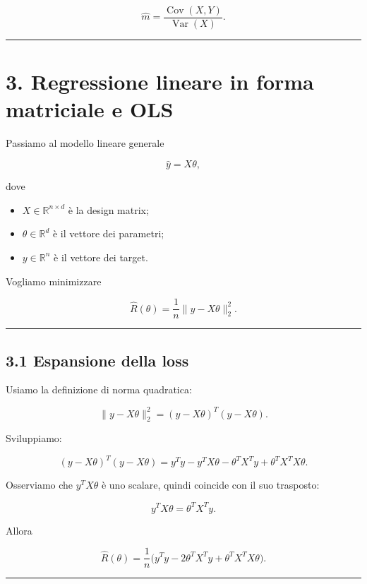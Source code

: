 \documentclass{article}
\providecommand{\tightlist}{%
  \setlength{\itemsep}{0pt}\setlength{\parskip}{0pt}}
\begin{document}
\[
\hat m = \frac{\operatorname{Cov}(X,Y)}{\operatorname{Var}(X)}.
\]

\begin{center}\rule{0.5\linewidth}{0.5pt}\end{center}

\section{3. Regressione lineare in forma matriciale e
OLS}\label{regressione-lineare-in-forma-matriciale-e-ols}

Passiamo al modello lineare generale

\[
\hat y = X\theta,
\]

dove

\begin{itemize}
\tightlist
\item
  \(X \in \mathbb{R}^{n\times d}\) è la design matrix;
\item
  \(\theta\in\mathbb{R}^d\) è il vettore dei parametri;
\item
  \(y\in\mathbb{R}^n\) è il vettore dei target.
\end{itemize}

Vogliamo minimizzare

\[
\hat R(\theta)=\frac{1}{n}\|y-X\theta\|_2^2.
\]

\begin{center}\rule{0.5\linewidth}{0.5pt}\end{center}

\subsection{3.1 Espansione della loss}\label{espansione-della-loss}

Usiamo la definizione di norma quadratica:

\[
\|y-X\theta\|_2^2 = (y-X\theta)^T(y-X\theta).
\]

Sviluppiamo:

\[
(y-X\theta)^T(y-X\theta)
=
y^Ty - y^TX\theta - \theta^TX^Ty + \theta^TX^TX\theta.
\]

Osserviamo che \(y^TX\theta\) è uno scalare, quindi coincide con il suo
trasposto:

\[
y^TX\theta = \theta^TX^Ty.
\]

Allora

\[
\hat R(\theta)=\frac{1}{n}\big(y^Ty - 2\theta^TX^Ty + \theta^TX^TX\theta\big).
\]

\begin{center}\rule{0.5\linewidth}{0.5pt}\end{center}
\end{document}
